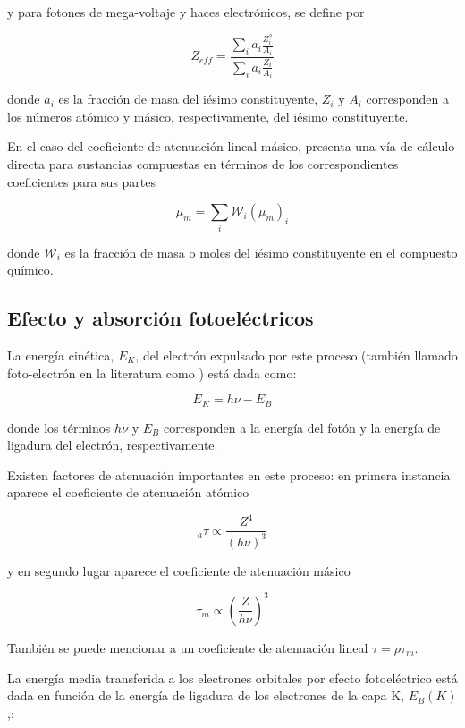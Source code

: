 \documentclass[12pt,letterpaper, oneside]{book}
\begin{document}
	 \noindent y para fotones de mega-voltaje y haces electrónicos, se define por
	 
	 \begin{equation}
	 	Z_{eff}=\frac{\sum_{i}a_i \frac{Z_i^2}{A_i}}{\sum_{i}a_i \frac{Z_i}{A_i}}
	 \end{equation}
	 
	 \noindent donde $a_i$ es la fracción de masa del iésimo constituyente, $Z_i$ y $A_i$ corresponden a los números atómico y másico, respectivamente, del iésimo constituyente. 
	 
	 En el caso del coeficiente de atenuación lineal másico, \cite{Mayles.2007} presenta una vía de cálculo directa para sustancias compuestas en términos de los correspondientes coeficientes para sus partes
	 
	 $$\mu_m=\sum_{i}\mathcal{W}_i (\mu_m)_i$$
	 
	 \noindent donde $\mathcal{W}_i$ es la fracción de masa o moles del iésimo constituyente en el compuesto químico. 
	 
	 \subsection{Efecto y absorción fotoeléctricos}
	 La energía cinética, $E_K$, del electrón expulsado por este proceso (también llamado foto-electrón en la literatura como \cite{IAEA.2005,Mayles.2007}) está dada como:
	 
	 \begin{equation}
	 	E_K=h\nu - E_B
	 \end{equation}
	 
	 \noindent donde los términos $h\nu$ y $E_B$ corresponden a la energía del fotón y la energía de ligadura del electrón, respectivamente. 
	 
	 Existen factores de atenuación importantes en este proceso: en primera instancia aparece el coeficiente de atenuación atómico 
	 
	 $$_a\tau \propto \frac{Z^4}{(h\nu)^3}$$
	 
	 \noindent y en segundo lugar aparece el coeficiente de atenuación másico
	 
	 $$\tau_m \propto \left(\frac{Z}{h\nu}\right)^3$$
	 
	 \noindent También se puede mencionar a un coeficiente de atenuación lineal $\tau=\rho \tau_m$\cite{Podgorsak.2016}. 
	 
	 La energía media transferida a los electrones orbitales por efecto fotoeléctrico está dada en función de la energía de ligadura de los electrones de la capa K, $E_B(K)$,:
	 
\end{document}

